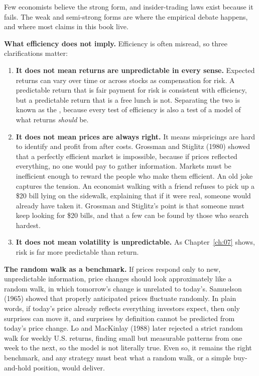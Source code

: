 Few economists believe the strong form, and insider-trading laws exist because it fails. The weak and semi-strong forms are where the empirical debate happens, and where most claims in this book live.

\textbf{What efficiency does not imply.} Efficiency is often misread, so three clarifications matter:

\begin{enumerate}
  \item \textbf{It does not mean returns are unpredictable in every sense.} Expected returns can vary over time or across stocks as compensation for risk. A predictable return that is fair payment for risk is consistent with efficiency, but a predictable return that is a free lunch is not. Separating the two is known as the , because every test of efficiency is also a test of a model of what returns \emph{should} be.
  \item \textbf{It does not mean prices are always right.} It means mispricings are hard to identify and profit from after costs. Grossman and Stiglitz (1980) showed that a perfectly efficient market is impossible, because if prices reflected everything, no one would pay to gather information. Markets must be inefficient enough to reward the people who make them efficient. An old joke captures the tension. An economist walking with a friend refuses to pick up a \$20 bill lying on the sidewalk, explaining that if it were real, someone would already have taken it. Grossman and Stiglitz's point is that someone must keep looking for \$20 bills, and that a few can be found by those who search hardest.
  \item \textbf{It does not mean volatility is unpredictable.} As Chapter~\ref{ch:07} shows, risk is far more predictable than return.
\end{enumerate}

\textbf{The random walk as a benchmark.} If prices respond only to new, unpredictable information, price changes should look approximately like a random walk, in which tomorrow's change is unrelated to today's. Samuelson (1965) showed that properly anticipated prices fluctuate randomly. In plain words, if today's price already reflects everything investors expect, then only surprises can move it, and surprises by definition cannot be predicted from today's price change. Lo and MacKinlay (1988) later rejected a strict random walk for weekly U.S. returns, finding small but measurable patterns from one week to the next, so the model is not literally true. Even so, it remains the right benchmark, and any strategy must beat what a random walk, or a simple buy-and-hold position, would deliver.

